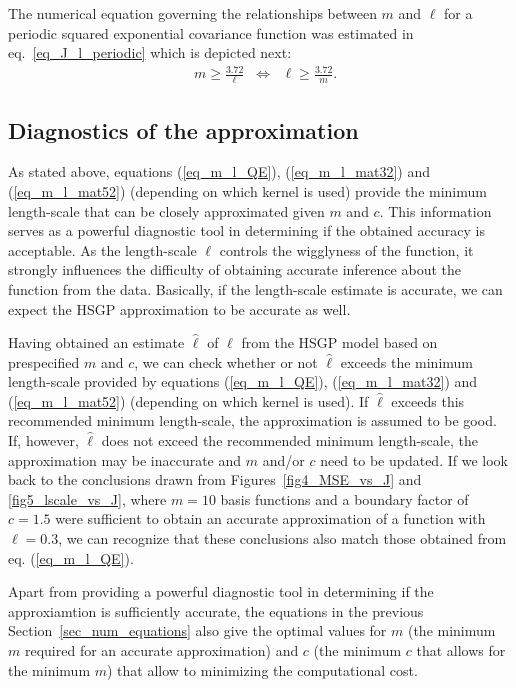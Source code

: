 The numerical equation governing the relationships between $m$ and $\ell$ for a periodic squared exponential covariance function was estimated in eq.~\eqref{eq_J_l_periodic} which is depicted next:
%
\begin{align*}
&m \geq \frac{3.72}{\ell} \;\; \Leftrightarrow \;\; \ell \geq \frac{3.72}{m} .
\end{align*}

\subsection{Diagnostics of the approximation} \label{subsec_diagnostics}

As stated above, equations (\ref{eq_m_l_QE}), (\ref{eq_m_l_mat32}) and (\ref{eq_m_l_mat52}) (depending on which kernel is used) provide the minimum length-scale that can be closely approximated given $m$ and $c$. This information serves as a powerful diagnostic tool in determining if the obtained accuracy is acceptable. As the length-scale $\ell$ controls the wigglyness of the function, it strongly influences the difficulty of obtaining accurate inference about the function from the data. Basically, if the length-scale estimate is accurate, we can expect the HSGP approximation to be accurate as well.

Having obtained an estimate $\hat{\ell}$ of $\ell$ from the HSGP model based on prespecified $m$ and $c$, we can check whether or not $\hat{\ell}$ exceeds the minimum length-scale provided by equations (\ref{eq_m_l_QE}), (\ref{eq_m_l_mat32}) and (\ref{eq_m_l_mat52}) (depending on which kernel is used). If $\hat{\ell}$ exceeds this recommended minimum length-scale, the approximation is assumed to be good. If, however, $\hat{\ell}$ does not exceed the recommended minimum length-scale, the approximation may be inaccurate and $m$ and/or $c$ need to be updated. If we look back to the conclusions drawn from Figures~\ref{fig4_MSE_vs_J} and \ref{fig5_lscale_vs_J}, where $m = 10$ basis functions and a boundary factor of $c = 1.5$ were sufficient to obtain an accurate approximation of a function with $\ell = 0.3$, we can recognize that these conclusions also match those obtained from eq. (\ref{eq_m_l_QE}).

Apart from providing a powerful diagnostic tool in determining if the approxiamtion is sufficiently accurate, the equations in the previous Section~\ref{sec_num_equations} also give the optimal values for $m$ (the minimum $m$ required for an accurate approximation) and $c$ (the minimum $c$ that allows for the minimum $m$) that allow to minimizing the computational cost.

